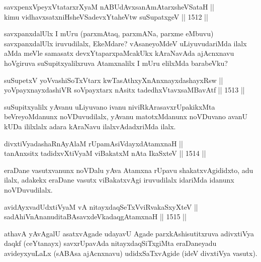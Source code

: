 \begin{shl}
savxpenxV\s peyxVtatarxrXyaM nABUdAvxsanAmAtarxsheVSataH ||  \\
kimu vidhavxsatxniHsheVSadevxYtaheVtw suSupatxgeV ||  1512 ||  
\end{shl}

\begin{artha}
savxpanxdalUlx I mUru (parxmAtaq, parxmANa, parxme eMbuvu) savxpanxdalUlx iruvudilalx, EkeMdare? vAsaneyoMdeV uLiyuvudariMda ilalx aMda meVle samasatx devxYtaparxpaMcakUkx kAraNavAda ajAcnxnavu hoVgiruva suSupitxyalilxruva Atamxnalilx I mUru elilxMda barabeVku?
\end{artha}

\begin{shl}
suSupetxV yoV\s vashiSoTxV\s tarx kwTasAthxyXnAnxnayxdashayxRsw || \\
yoV\s payxnayxdashiVR soV\s payxtarx nAsitx tadedhxVtavxsaMBavAtf ||  1513 ||  
\end{shl}

\begin{artha}
suSupitxyalilx yAvanu uLiyuvano ivanu niviRkArasavxrUpakikxMta beVreyoMdanunx noVDuvudilalx, yAvanu matotxMdanunx noVDuvano avanU kUDa ililxlalx adara kAraNavu ilalxvAdadxriMda ilalx.
\end{artha}

\begin{shl}
divxtiVyadashaRnAyAlaM rUpamAsiVdayxdAtamxnaH || \\
tanAnxsitx tadidxvXtiVyaM viBakatxM nAta IkaSxteV ||  1514 ||  
\end{shl}

\begin{artha}
eraDane vasutxvanunx noVDalu yAva Atamxna rUpavu shakatxvAgididxto, adu ilalx, adakekx eraDane vasutx viBakatxvAgi iruvudilalx idariMda idanunx noVDuvudilalx.
\end{artha}

\begin{shl}
avidAyxvadUdxtiVyaM vA nitayxdaqSeTxVviRvakaSxyXteV ||  \\
sadAhiVnAnanuditaBAsavxdeVkadaqgAtamxnaH ||  1515 ||  
\end{shl}

\begin{artha}
athavA yAvAgalU asatxvAgade udayavU Agade parxkAshisutitxruva adivxtiVya daqkf (ceYtanayx) savxrUpavAda nitayxdaqSiTxgiMta eraDaneyadu avideyxyuLaLx (sABAsa ajAcnxnavu) udidxSaTxvAgide (ideV divxtiVya vasutx).
\end{artha}

